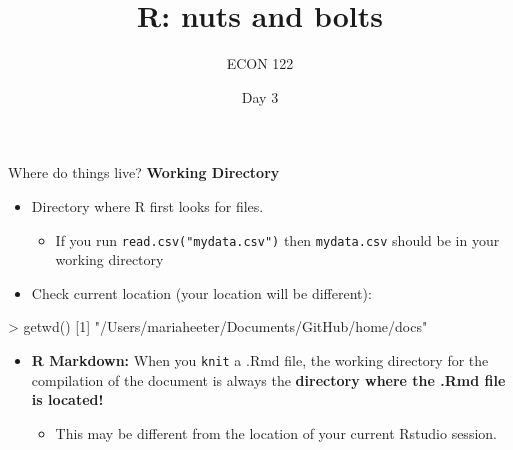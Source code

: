 \documentclass[
  ignorenonframetext,
]{beamer}
\title{R: nuts and bolts}
\author{ECON 122}
\date{Day 3}
\newenvironment{Shaded}{\begin{snugshade}}{\end{snugshade}}
\newcommand{\DecValTok}[1]{\textcolor[rgb]{0.00,0.00,0.81}{#1}}
\newcommand{\FunctionTok}[1]{\textcolor[rgb]{0.00,0.00,0.00}{#1}}
\newcommand{\NormalTok}[1]{#1}
\newcommand{\SpecialCharTok}[1]{\textcolor[rgb]{0.00,0.00,0.00}{#1}}
\newcommand{\StringTok}[1]{\textcolor[rgb]{0.31,0.60,0.02}{#1}}
\providecommand{\tightlist}{%
  \setlength{\itemsep}{0pt}\setlength{\parskip}{0pt}}
\begin{document}
\frame{\titlepage}

\begin{frame}[fragile]{Where do things live? \textbar{} \textbf{Working
Directory}}
\protect\hypertarget{where-do-things-live-working-directory}{}
\begin{itemize}[<+->]
\tightlist
\item
  Directory where R first looks for files.

  \begin{itemize}[<+->]
  \tightlist
  \item
    If you run \texttt{read.csv("mydata.csv")} then \texttt{mydata.csv}
    should be in your working directory
  \end{itemize}
\item
  Check current location (your location will be different):
\end{itemize}

\begin{Shaded}
\begin{Highlighting}[]
\SpecialCharTok{\textgreater{}} \FunctionTok{getwd}\NormalTok{()}
\NormalTok{[}\DecValTok{1}\NormalTok{] }\StringTok{"/Users/mariaheeter/Documents/GitHub/home/docs"}
\end{Highlighting}
\end{Shaded}

\begin{itemize}[<+->]
\tightlist
\item
  \textbf{R Markdown:} When you \texttt{knit} a .Rmd file, the working
  directory for the compilation of the document is always the
  \textbf{directory where the .Rmd file is located!}

  \begin{itemize}[<+->]
  \tightlist
  \item
    This may be different from the location of your current Rstudio
    session.
  \end{itemize}
\end{itemize}
\end{frame}
\end{document}
